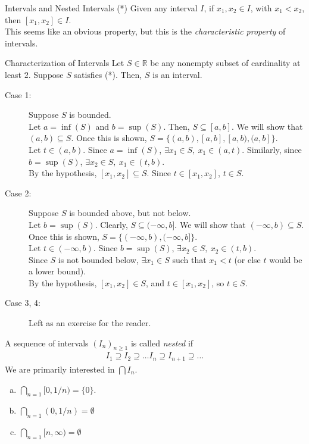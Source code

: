 \documentclass[8pt]{extarticle}
\newcommand{\R}{\mathbb{R}}
\begin{document}
  \begin{problem}{Intervals and Nested Intervals}
    (*) Given any interval $I$, if $x_1,x_2\in I$, with $x_1 < x_2$, then $[x_1,x_2]\in I$.\\

    This seems like an obvious property, but this is the \textit{characteristic property} of intervals.
    \begin{problem}{Characterization of Intervals}
      Let $S\in\R$ be any nonempty subset of cardinality at least $2$. Suppose $S$ satisfies (*). Then, $S$ is an interval.
      \tcblower
      \begin{description}
        \item[Case 1:] Suppose $S$ is bounded.\\

          Let $a = \inf(S)$ and $b = \sup(S)$. Then, $S \subseteq [a,b]$. We will show that $(a,b)\subseteq S$. Once this is shown, $S = \{(a,b), [a,b], [a,b), (a,b]\}$.\\

          Let $t\in (a,b)$. Since $a = \inf(S)$, $\exists x_1\in S,~x_1 \in (a,t)$. Similarly, since $b = \sup(S)$, $\exists x_2\in S,~x_1\in (t,b)$.\\

          By the hypothesis, $[x_1,x_2]\subseteq S$. Since $t\in [x_1,x_2]$, $t\in S$.
        \item[Case 2:] Suppose $S$ is bounded above, but not below.\\

          Let $b = \sup(S)$. Clearly, $S \subseteq (-\infty,b]$. We will show that $(-\infty,b)\subseteq S$. Once this is shown, $S = \{(-\infty,b), (-\infty,b]\}$.\\

          Let $t\in (-\infty,b)$. Since $b = \sup(S)$, $\exists x_2\in S,~x_2\in (t,b)$.\\

          Since $S$ is not bounded below, $\exists x_1\in S$ such that $x_1 < t$ (or else $t$ would be a lower bound).\\

          By the hypothesis, $[x_1,x_2]\in S$, and $t\in [x_1,x_2]$, so $t\in S$.
        \item[Case 3, 4:] Left as an exercise for the reader.
      \end{description}
    \end{problem}
    A sequence of intervals $(I_n)_{n \geq 1}$ is called \textit{nested} if
    \begin{align*}
      I_1 \supseteq I_2 \supseteq \dots I_n \supseteq I_{n+1} \supseteq\dots
    \end{align*}
    We are primarily interested in $\bigcap I_n$.
    \begin{enumerate}[(a)]
      \item $\bigcap_{n=1}[0,1/n) = \{0\}$.
      \item $\bigcap_{n=1}(0,1/n) = \emptyset$
      \item $\bigcap_{n=1}[n,\infty) = \emptyset$
    \end{enumerate}
  \end{problem}
\end{document}
